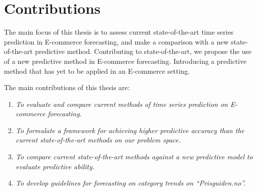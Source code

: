 \section{Contributions}
\label{sections:Introduction:Contributions}



The main focus of this thesis is to assess current state-of-the-art time series prediction in E-commerce forecasting,
and make a comparison with a new state-of-the-art predictive method.
Contributing to state-of-the-art,
we propose the use of a new predictive method in E-commerce forecasting.
Introducing a predictive method that has yet to be applied in an E-commerce setting.

The main contributions of this thesis are:
\begin{enumerate}
  \item {\it To evaluate and compare current methods of time series prediction on E-commerce forecasting.}
  \item {\it To formulate a framework for achieving higher predictive accuracy than the current state-of-the-art methods on our problem space.}
  \item {\it To compare current state-of-the-art methods against a new predictive model to evaluate predictive ability.}
  \item {\it To develop guidelines for forecasting on category trends on ``Prisguiden.no''.}
\end{enumerate}




\iffalse
  The main focus of this work is to assess the current state of time series prediction in E-commerce forecasting.
  Contributing to the current state of the art,
  we propose a method for increasing the predictive ability of time series forecasting
  assessing interest trends of e-commerce product categories.
  The main contributions of this thesis are:

  \begin{enumerate}
    \item {\it To evaluate and compare current methods of time series prediction on e-commerce.}
    \item {\it To evaluate and compare current state-of-the-art methods for time series forecasting.}
    \item {\it Formulates a framework for achieving higher predictive accuracy than the current state-of-the-art methods on our problem space.}
  \end{enumerate}
\fi



